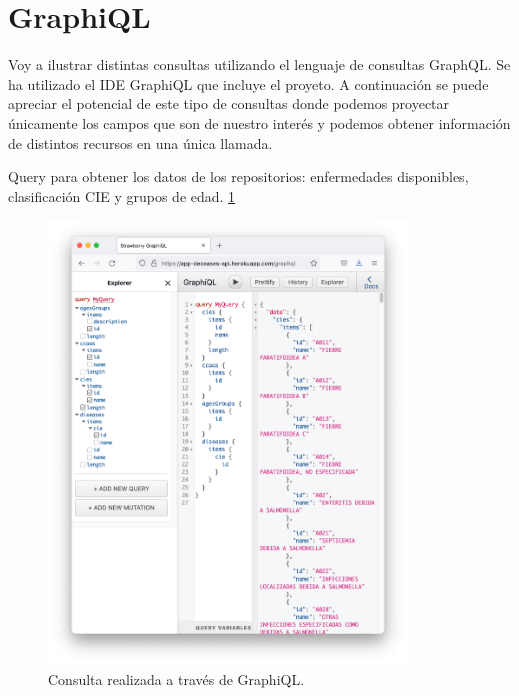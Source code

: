 \section{GraphiQL}
Voy a ilustrar distintas consultas utilizando el lenguaje de consultas GraphQL. Se ha 
utilizado el IDE GraphiQL que incluye el proyeto. A continuación se puede apreciar el 
potencial de este tipo de consultas donde podemos proyectar únicamente los campos que 
son de nuestro interés y podemos obtener información de distintos recursos en una única llamada.

\vskip 0.4in

Query para obtener los datos de los repositorios: enfermedades disponibles, clasificación CIE y grupos de edad. \ref{fig:4}
\FloatBarrier
\begin{figure}[h]
	\centering
	\includegraphics[width=0.85\textwidth]{doc/logos/imgs/ejemplo3.png}
	\caption{ Consulta realizada a través de GraphiQL. }
	\label{fig:4}
\end{figure}
\FloatBarrier

